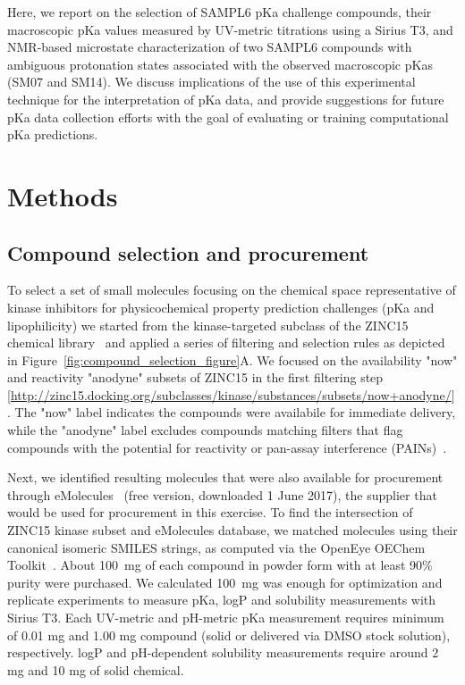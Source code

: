\documentclass[9pt,lineno]{elife}
\begin{document}
Here, we report on the selection of SAMPL6 pKa challenge compounds, their macroscopic pKa values measured by UV-metric titrations using a Sirius T3, and NMR-based microstate characterization of two SAMPL6 compounds with ambiguous protonation states associated with the observed macroscopic pKas (SM07 and SM14). 
We discuss implications of the use of this experimental technique for the interpretation of pKa data, and provide suggestions for future pKa data collection efforts with the goal of evaluating or training computational pKa predictions.

\section{Methods}

\subsection{Compound selection and procurement}

To select a set of small molecules focusing on the chemical space representative of kinase inhibitors for physicochemical property prediction challenges (pKa and lipophilicity) we started from the kinase-targeted subclass of the ZINC15 chemical library~\citep{sterling_zinc_2015} and applied a series of filtering and selection rules as depicted in Figure~\ref{fig:compound_selection_figure}A. 
We focused on the availability "now" and reactivity "anodyne" subsets of ZINC15 in the first filtering step [\url{http://zinc15.docking.org/subclasses/kinase/substances/subsets/now+anodyne/}]. 
The "now" label indicates the compounds were availabile for immediate delivery, while the "anodyne" label excludes compounds matching filters that flag compounds with the potential for reactivity or pan-assay interference (PAINs)~\citep{baell_new_2010, saubern_knime_2011}. 

Next, we identified resulting molecules that were also available for procurement through eMolecules~\citep{eMolecules_ref_2017} (free version, downloaded 1 June 2017), the supplier that would be used for procurement in this exercise. 
To find the intersection of ZINC15 kinase subset and eMolecules database, we matched molecules using their canonical isomeric SMILES strings, as computed via the OpenEye OEChem Toolkit~\citep{oechem_openeye_2017}. 
About 100~mg of each compound in powder form with at least 90\% purity were purchased. We calculated 100~mg was enough for optimization and replicate experiments to measure pKa, logP and solubility measurements with Sirius T3. Each UV-metric and pH-metric pKa measurement requires minimum of 0.01 mg and 1.00 mg compound (solid or delivered via DMSO stock solution), respectively. logP and pH-dependent solubility measurements require around 2 mg and 10 mg of solid chemical. 
\end{document}
